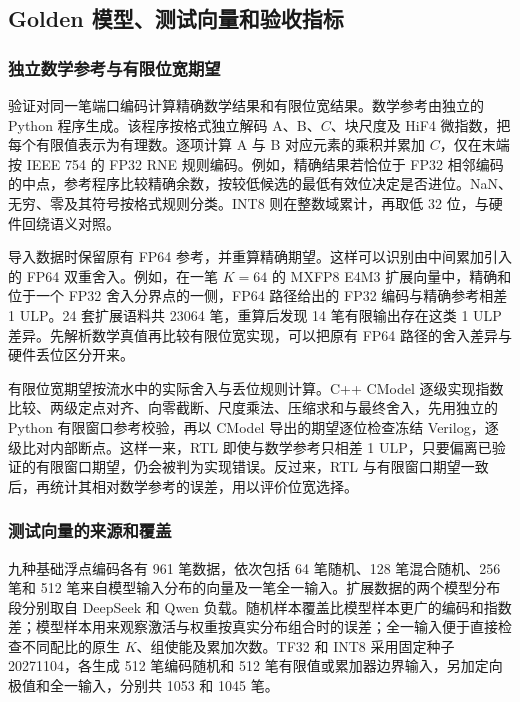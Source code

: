 \documentclass[10.5pt,compsoc,UTF8]{CjC}
\begin{document}
\subsection{Golden 模型、测试向量和验收指标}

\subsubsection{独立数学参考与有限位宽期望}

验证对同一笔端口编码计算精确数学结果和有限位宽结果。数学参考由独立的 Python 程序生成。该程序按格式独立解码 A、B、$C$、块尺度及 HiF4 微指数，把每个有限值表示为有理数。逐项计算 A 与 B 对应元素的乘积并累加 $C$，仅在末端按 IEEE 754 的 FP32 RNE 规则编码\cite{ieee754,Goldberg1991}。例如，精确结果若恰位于 FP32 相邻编码的中点，参考程序比较精确余数，按较低候选的最低有效位决定是否进位。NaN、无穷、零及其符号按格式规则分类。INT8 则在整数域累计，再取低 32 位，与硬件回绕语义对照。

导入数据时保留原有 FP64 参考，并重算精确期望。这样可以识别由中间累加引入的 FP64 双重舍入。例如，在一笔 $K=64$ 的 MXFP8 E4M3 扩展向量中，精确和位于一个 FP32 舍入分界点的一侧，FP64 路径给出的 FP32 编码与精确参考相差 1 ULP。24 套扩展语料共 23064 笔，重算后发现 14 笔有限输出存在这类 1 ULP 差异。先解析数学真值再比较有限位宽实现，可以把原有 FP64 路径的舍入差异与硬件丢位区分开来。

有限位宽期望按流水中的实际舍入与丢位规则计算。C++ CModel 逐级实现指数比较、两级定点对齐、向零截断、尺度乘法、压缩求和与最终舍入，先用独立的 Python 有限窗口参考校验，再以 CModel 导出的期望逐位检查冻结 Verilog，逐级比对内部断点。这样一来，RTL 即使与数学参考只相差 1 ULP，只要偏离已验证的有限窗口期望，仍会被判为实现错误。反过来，RTL 与有限窗口期望一致后，再统计其相对数学参考的误差，用以评价位宽选择。

\subsubsection{测试向量的来源和覆盖}

九种基础浮点编码各有 961 笔数据，依次包括 64 笔随机、128 笔混合随机、256 笔和 512 笔来自模型输入分布的向量及一笔全一输入。扩展数据的两个模型分布段分别取自 DeepSeek 和 Qwen 负载。随机样本覆盖比模型样本更广的编码和指数差；模型样本用来观察激活与权重按真实分布组合时的误差；全一输入便于直接检查不同配比的原生 $K$、组使能及累加次数。TF32 和 INT8 采用固定种子 20271104，各生成 512 笔编码随机和 512 笔有限值或累加器边界输入，另加定向极值和全一输入，分别共 1053 和 1045 笔。
\end{document}
